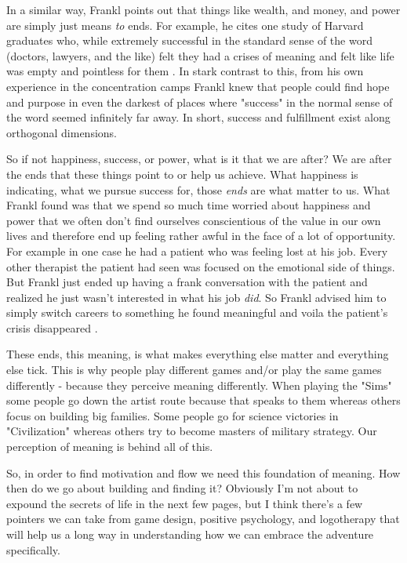 \documentclass[11pt]{book}
\begin{document}
In a similar way, Frankl points out that things like wealth, and money, and power are simply just means \textit{to} ends. For example, he cites one study of Harvard graduates who, while extremely successful in the standard sense of the word (doctors, lawyers, and the like) felt they had a crises of meaning and felt like life was empty and pointless for them \cite{frankl}. In stark contrast to this, from his own experience in the concentration camps Frankl knew that people could find hope and purpose in even the darkest of places where "success" in the normal sense of the word seemed infinitely far away. In short, success and fulfillment exist along orthogonal dimensions. 
\newline

So if not happiness, success, or power, what is it that we are after? We are after the ends that these things point to or help us achieve. What happiness is indicating, what we pursue success for, those \textit{ends} are what matter to us. What Frankl found was that we spend so much time worried about happiness and power that we often don't find ourselves conscientious of the value in our own lives and therefore end up feeling rather awful in the face of a lot of opportunity. For example in one case he had a patient who was feeling lost at his job. Every other therapist the patient had seen was focused on the emotional side of things. But Frankl just ended up having a frank conversation with the patient and realized he just wasn't interested in what his job \textit{did}. So Frankl advised him to simply switch careers to something he found meaningful and voila the patient's crisis disappeared \cite{ikigai}. 
\newline

These ends, this meaning, is what makes everything else matter and everything else tick. This is why people play different games and/or play the same games differently - because they perceive meaning differently. When playing the "Sims" some people go down the artist route because that speaks to them whereas others focus on building big families. Some people go for science victories in "Civilization" whereas others try to become masters of military strategy. Our perception of meaning is behind all of this. 
\newline

So, in order to find motivation and flow we need this foundation of meaning. How then do we go about building and finding it? Obviously I'm not about to expound the secrets of life in the next few pages, but I think there's a few pointers we can take from game design, positive psychology, and logotherapy that will help us a long way in understanding how we can embrace the adventure specifically.
\end{document}
